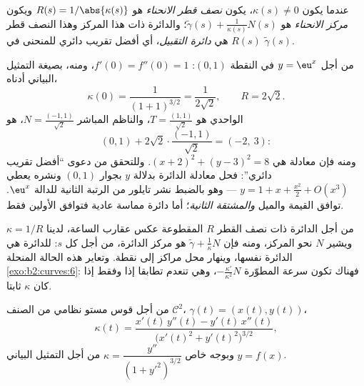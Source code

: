 \begin{definition}\label{def:b2:curves:curvature}
عندما يكون $\kappa(s) \neq 0$، يكون \emph{نصف قطر الانحناء}
هو $R(s) =
1/\abs{\kappa(s)}$ ويكون \emph{مركز الانحناء} هو
$\tilde\gamma(s) + \frac{1}{\kappa(s)} N(s)$؛ والدائرة ذات هذا المركز وهذا النصف قطر $R(s)$ هي
\emph{دائرة التقبيل}، أي أفضل تقريب دائري
للمنحنى في $\tilde\gamma(s)$.
\end{definition}

\begin{example}\label{ex:b2:curves:oscexp}
من أجل $y = \eu^x$ في النقطة $(0, 1)$: $f'(0) = f''(0) = 1$، ومنه، بصيغة التمثيل
البياني أدناه،
\[
\kappa(0) = \frac{1}{(1 + 1)^{3/2}} = \frac1{2\sqrt2},
\qquad R = 2\sqrt2 .
\]
 الواحدي هو $T = \frac{(1, 1)}{\sqrt2}$، والناظم المباشر $N = \frac{(-1, 1)}{\sqrt2}$، 
هو
\[
(0, 1) + 2\sqrt2\cdot\frac{(-1, 1)}{\sqrt2} = (-2,\ 3) :
\]
ومنه فإن معادلة  هي $(x + 2)^2 + (y - 3)^2 =
8$. وللتحقق من دعوى ``أفضل
تقريب دائري'': فحل معادلة الدائرة بدلالة $y$ بجوار $(0,1)$ ونشره
يعطي $y = 1 + x + \frac{x^2}2 + O(x^3)$ --- وهو بالضبط نشر تايلور من الرتبة الثانية للدالة
$\eu^x$.  توافق القيمة والميل \emph{والمشتقة الثانية}؛
أما دائرة مماسة عادية فتوافق الأولين فقط.
\end{example}

\begin{example}\label{ex:b2:curves:circleevolute}
من أجل الدائرة ذات نصف القطر $R$ المقطوعة عكس عقارب الساعة، لدينا
$\kappa = 1/R$ ويشير $N$ نحو المركز، ومنه فإن  $\tilde\gamma + \frac1\kappa N$ هو
مركز الدائرة، من أجل كل $s$:  للدائرة هي الدائرة
نفسها، وينهار محل مراكز  إلى نقطة. وتعاير هذه الحالة المنحلة
\cref{exo:b2:curves:6}: فهناك تكون سرعة المطوّرة $-\frac{\kappa'}{\kappa^2}N$، وهي تنعدم تطابقا إذا وفقط
إذا كان $\kappa$ ثابتا.
\end{example}

\begin{proposition}\label{prop:b2:curves:kappaformula}
من أجل قوس مستو نظامي من الصنف $\mathcal{C}^2$، $\gamma(t) = (x(t), y(t))$،
\[
\kappa(t)
= \frac{x'(t)\,y''(t) - y'(t)\,x''(t)}
       {\bigl(x'(t)^2 + y'(t)^2\bigr)^{3/2}} ,
\]
وبوجه خاص $\kappa = \dfrac{y''}{(1 + y'^2)^{3/2}}$ من أجل التمثيل البياني $y = f(x)$.
\end{proposition}

